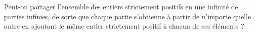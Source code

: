 Peut-on partager l'ensemble des entiers strictement positifs en une infinité de parties infinies, de sorte que chaque partie s'obtienne à partir de n'importe quelle autre en ajoutant le même entier strictement positif à chacun de ses éléments ?
